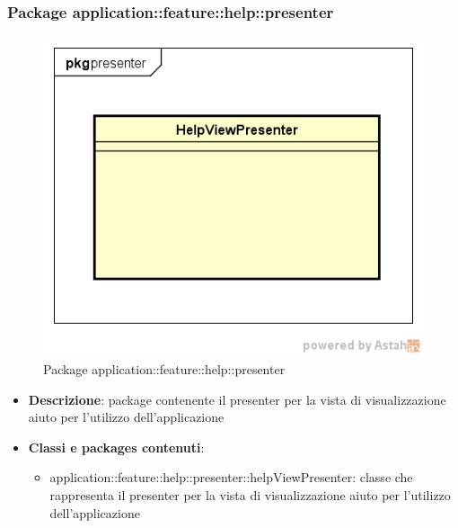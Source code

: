 \subsubsection{Package application::feature::help::presenter}
\label{Package application::feature::help::presenter}
\begin{figure}[H]
	\centering
	\includegraphics[scale=0.5]{Sezioni/Packages/Application/help_presenter.png}
	\caption{Package application::feature::help::presenter}
\end{figure}
\begin{itemize}
	\item \textbf{Descrizione}: package contenente il presenter per la vista di visualizzazione aiuto per l'utilizzo dell'applicazione
	\item \textbf{Classi e packages contenuti}:
	\begin{itemize}
	\item application::feature::help::presenter::helpViewPresenter: classe che rappresenta il presenter per la vista di visualizzazione aiuto per l'utilizzo dell'applicazione
	\end{itemize}
\end{itemize}

